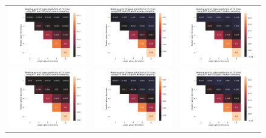 \documentclass{article}
\begin{document}
\begin{figure}
    \centering
    \begin{tabular}{ccc}
        \includegraphics[width=0.27\linewidth]{../plots_dimensions/dimensions_pot_estimate_voronoi.png} & 
        \includegraphics[width=0.27\linewidth]{../plots_dimensions/dimensions_pot_estimate_arrange.png} & 
        \includegraphics[width=0.27\linewidth]{../plots_dimensions/dimensions_pot_estimate_random.png} \\
        \includegraphics[width=0.27\linewidth]{../plots_dimensions/dimensions_ott_estimate_reg0.01_voronoi.png} & 
        \includegraphics[width=0.27\linewidth]{../plots_dimensions/dimensions_ott_estimate_reg0.01_arrange.png} & 
        \includegraphics[width=0.27\linewidth]{../plots_dimensions/dimensions_ott_estimate_reg0.01_random.png}
    \end{tabular}

\end{figure}
\end{document}

